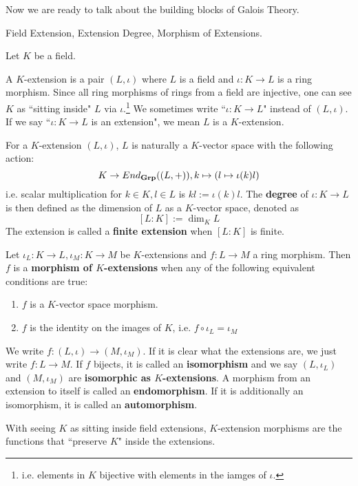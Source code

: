 \documentclass[../book.tex]{subfiles}
\begin{document}
Now we are ready to talk about the building blocks of Galois Theory.

\begin{dfn} Field Extension, Extension Degree, Morphism of Extensions. 

    Let $K$ be a field. 

    A $K$-extension is a pair $(L,\iota)$ where $L$ is a field 
    and $\iota : K \to L$ is a ring morphism. 
    Since all ring morphisms of rings from a field are injective,
    one can see $K$ as ``sitting inside" $L$ via $\iota$.\footnote{
        i.e. elements in $K$ bijective with 
        elements in the iamges of $\iota$. 
    }
    We sometimes write ``$\iota : K \to L$" instead of $(L,\iota)$.
    If we say ``$\iota : K \to L$ is an extension", we mean
    $L$ is a $K$-extension.
    
    For a $K$-extension $(L,\iota)$, 
    $L$ is naturally a $K$-vector space with the following action: 
    \[
        K \to End_{\mathbf{Grp}}((L,+)), k \mapsto (l \mapsto \iota(k) l)
    \]
    i.e. scalar multiplication for $k \in K, l \in L$ is $kl := \iota(k)l$.
    The \textbf{degree} of $\iota : K \to L$ is then defined as
    the dimension of $L$ as a $K$-vector space, denoted as \[
        [L : K] := \dim_K L
    \]
    The extension is called a \textbf{finite extension} when $[L:K]$ is finite. 
    
    Let $\iota_L : K \to L, \iota_M : K \to M$ be $K$-extensions and
    $f : L \to M$ a ring morphism.
    Then $f$ is a \textbf{morphism of $K$-extensions} when 
    any of the following equivalent conditions are true: 
    \begin{enumerate}
        \item $f$ is a $K$-vector space morphism.
        \item $f$ is the identity on the images of $K$, i.e.
        $f\circ\iota_L = \iota_M$
    \end{enumerate}
    We write $f : (L,\iota) \to (M,\iota_M)$. 
    If it is clear what the extensions are, we just write $f : L \to M$. 
    If $f$ bijects, it is called an \textbf{isomorphism} and
    we say $(L,\iota_L)$ and $(M,\iota_M)$ are \textbf{isomorphic as $K$-extensions}.
    A morphism from an extension to itself is called an \textbf{endomorphism}.
    If it is additionally an isomorphism, it is called an \textbf{automorphism}. 
    
    With seeing $K$ as sitting inside field extensions, 
    $K$-extension morphisms are the functions that ``preserve $K$" 
    inside the extensions. 
\end{dfn}
\end{document}
